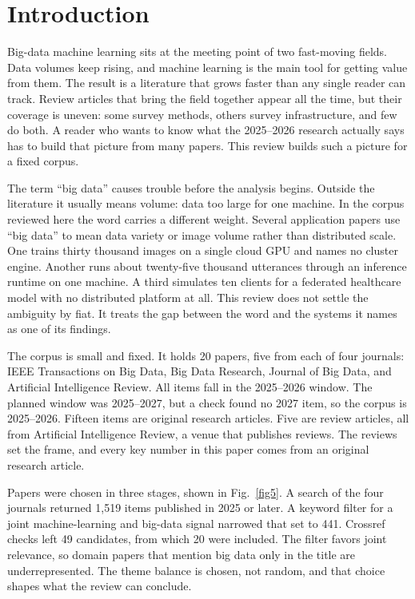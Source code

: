 \documentclass[pdflatex,sn-basic,Numbered]{sn-jnl}%
\begin{document}
\maketitle

\section{Introduction}\label{sec1}

Big-data machine learning sits at the meeting point of two fast-moving fields. Data volumes keep rising, and machine learning is the main tool for getting value from them. The result is a literature that grows faster than any single reader can track. Review articles that bring the field together appear all the time, but their coverage is uneven: some survey methods, others survey infrastructure, and few do both. A reader who wants to know what the 2025--2026 research actually says has to build that picture from many papers. This review builds such a picture for a fixed corpus.

The term ``big data'' causes trouble before the analysis begins. Outside the literature it usually means volume: data too large for one machine. In the corpus reviewed here the word carries a different weight. Several application papers use ``big data'' to mean data variety or image volume rather than distributed scale. One trains thirty thousand images on a single cloud GPU and names no cluster engine. Another runs about twenty-five thousand utterances through an inference runtime on one machine. A third simulates ten clients for a federated healthcare model with no distributed platform at all. This review does not settle the ambiguity by fiat. It treats the gap between the word and the systems it names as one of its findings.

The corpus is small and fixed. It holds 20 papers, five from each of four journals: IEEE Transactions on Big Data, Big Data Research, Journal of Big Data, and Artificial Intelligence Review. All items fall in the 2025--2026 window. The planned window was 2025--2027, but a check found no 2027 item, so the corpus is 2025--2026. Fifteen items are original research articles. Five are review articles, all from Artificial Intelligence Review, a venue that publishes reviews. The reviews set the frame, and every key number in this paper comes from an original research article.

Papers were chosen in three stages, shown in Fig.~\ref{fig5}. A search of the four journals returned 1{,}519 items published in 2025 or later. A keyword filter for a joint machine-learning and big-data signal narrowed that set to 441. Crossref checks left 49 candidates, from which 20 were included. The filter favors joint relevance, so domain papers that mention big data only in the title are underrepresented. The theme balance is chosen, not random, and that choice shapes what the review can conclude.
\end{document}
